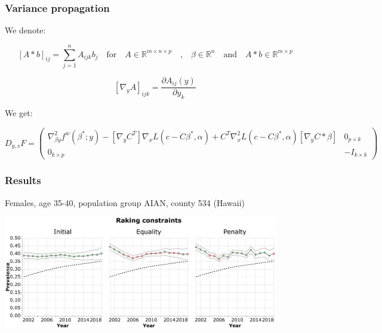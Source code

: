 \documentclass[aspectratio=169]{beamer}
\begin{document}
\begin{frame}
	\frametitle{Variance propagation}
	We denote:

	\begin{equation*}
	\left[ A * b \right]_{ij} = \sum_{j = 1}^n A_{ijk} b_j \quad \text{for} \quad A \in \mathbb{R}^{m \times n \times p} \quad \text{,} \quad \beta \in \mathbb{R}^n \quad \text{and} \quad A * b \in \mathbb{R}^{m \times p}
	\end{equation*}

	\begin{equation*}
	\left[ \nabla_y A \right]_{ijk} = \frac{\partial A_{ij} \left( y \right)}{\partial y_k}
	\end{equation*}

	We get:

	\begin{equation*}
	D_{y , s} F = \begin{pmatrix} \nabla^2_{\beta y} f^w \left( \beta^* ; y \right) - \left[ \nabla_y C^T \right] \nabla_x L \left( c - C \beta^* , \alpha \right) + C^T \nabla_x^2 L \left( c - C \beta^* , \alpha \right) \left[ \nabla_y C * \beta \right] & 0_{p \times k} \\ 0_{k \times p} & - I_{k \times k} \end{pmatrix}
	\end{equation*}
\end{frame}

\begin{frame}
	\frametitle{Results}
	\centering
	Females, age 35-40, population group AIAN, county 534 (Hawaii)

	\vspace{1em}

	\includegraphics[width=12cm]{obesity_2_35_6_534.eps}
\end{frame}
\end{document}
